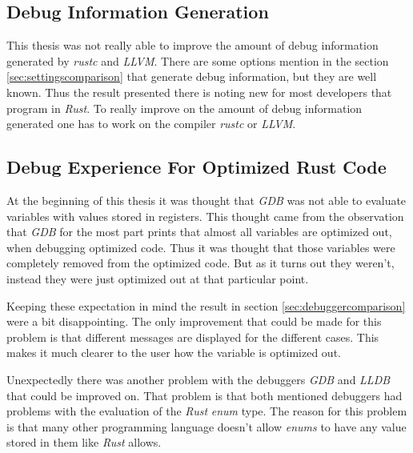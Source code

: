 



\subsection{Debug Information Generation}
This thesis was not really able to improve the amount of debug information generated by \emph{rustc} and \emph{LLVM}.
There are some options mention in the section \ref{sec:settingscomparison} that generate debug information, but they are well known.
Thus the result presented there is noting new for most developers that program in \emph{Rust}.
To really improve on the amount of debug information generated one has to work on the compiler \emph{rustc} or \emph{LLVM}.


\subsection{Debug Experience For Optimized Rust Code}
At the beginning of this thesis it was thought that \emph{GDB} was not able to evaluate variables with values stored in registers.
This thought came from the observation that \emph{GDB} for the most part prints that almost all variables are optimized out,  when debugging optimized code.
Thus it was thought that those variables were completely removed from the optimized code.
But as it turns out they weren't, instead they were just optimized out at that particular point.


Keeping these expectation in mind the result in section \ref{sec:debuggercomparison} were a bit disappointing.
The only improvement that could be made for this problem is that different messages are displayed for the different cases.
This makes it much clearer to the user how the variable is optimized out.


Unexpectedly there was another problem with the debuggers \emph{GDB} and \emph{LLDB} that could be improved on.
That problem is that both mentioned debuggers had problems with the evaluation of the \emph{Rust} \emph{enum} type.
The reason for this problem is that many other programming language doesn't allow \emph{enums} to have any value stored in them like \emph{Rust} allows.


